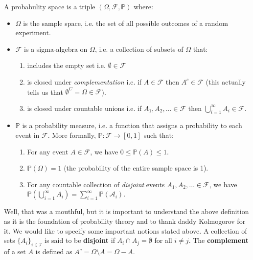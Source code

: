 \begin{definition}
   A probabulity space is a triple $(\Omega, \mathcal{F}, \mathbb{P})$ where:
   \begin{itemize}
      \item $\Omega$ is the sample space, i.e. the set of all possible outcomes of a random experiment.
      \item $\mathcal{F}$ is a sigma-algebra on $\Omega$, i.e. a collection of subsets of $\Omega$ that:
      \begin{enumerate}
         \item includes the empty set i.e. $\emptyset \in \mathcal{F}$
         \item is closed under \textit{complementation} i.e. if $A \in \mathcal{F}$ then $A^c \in \mathcal{F}$ (this actually tells us that $\emptyset^C = \Omega \in \mathcal{F}$).
         \item is closed under countable unions i.e. if $A_1, A_2, \ldots \in \mathcal{F}$ then $\bigcup_{i=1}^{\infty} A_i \in \mathcal{F}$.
      \end{enumerate}
      \item $\mathbb{P}$ is a probability measure, i.e. a function that assigns a probability to each event in $\mathcal{F}$. More formally, $\mathbb{P}: \mathcal{F} \to [0,1]$ such that:
      \begin{enumerate}
         \item For any event $A \in \mathcal{F}$, we have $0 \leq \mathbb{P}(A) \leq 1$.
         \item $\mathbb{P}(\Omega) = 1$ (the probability of the entire sample space is 1).
         \item For any countable collection of \textit{disjoint} events $A_1, A_2, \ldots \in \mathcal{F}$, we have $\mathbb{P}\left(\bigcup_{i=1}^{\infty} A_i\right) = \sum_{i=1}^{\infty} \mathbb{P}(\mathcal{A}_i)$.
      \end{enumerate} 
   \end{itemize}
\end{definition}

\vspace{0.2cm}

Well, that was a mouthful, but it is important to understand the above definition as it is the foundation of probability theory and to thank daddy Kolmogorov for it. We would like to
specify some important notions stated above. A collection of sets $\{A_i\}_{i \in \mathcal{I}}$ is said to be \textbf{disjoint} if $A_i \cap A_j = \emptyset$ for all $i \neq j$. The \textbf{complement} of a set $A$ is defined as $A^c = \Omega \setminus A = \Omega - A$.

